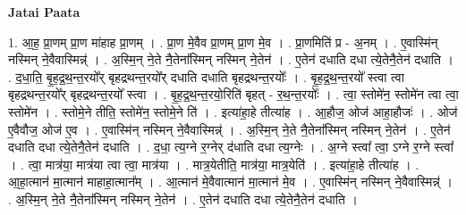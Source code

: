 \documentclass[17pt]{extarticle}
\begin{document}
\textbf{Jatai Paata} \newline

1. आ॒ह॒ प्रा॒णम् प्रा॒ण मा॑हाह प्रा॒णम् । . प्रा॒ण मे॒वैव प्रा॒णम् प्रा॒ण मे॒व । . प्रा॒णमिति॑ प्र - अ॒नम् । . ए॒वास्मि॑न् नस्मिन् ने॒वैवास्मिन्न्॑ । . अ॒स्मि॒न् ने॒ते नै॒तेना᳚स्मिन् नस्मिन् ने॒तेन॑ । . ए॒तेन॑ दधाति दधा त्ये॒तेनै॒तेन॑ दधाति । . द॒धा॒ति॒ बृ॒ह॒द्र॒थ॒न्त॒रयो᳚र् बृहद्रथन्त॒रयो᳚र् दधाति दधाति बृहद्रथन्त॒रयोः᳚ । . बृ॒ह॒द्र॒थ॒न्त॒रयो᳚ स्त्वा त्वा बृहद्रथन्त॒रयो᳚र् बृहद्रथन्त॒रयो᳚ स्त्वा । . बृ॒ह॒द्र॒थ॒न्त॒रयो॒रिति॑ बृहत् - र॒थ॒न्त॒रयोः᳚ । . त्वा॒ स्तोमे॑न॒ स्तोमे॑न त्वा त्वा॒ स्तोमे॑न । . स्तोमे॒ने तीति॒ स्तोमे॑न॒ स्तोमे॒ने ति॑ । . इत्या॑हा॒हे तीत्या॑ह । . आ॒हौज॒ ओज॑ आहा॒हौजः॑ । . ओज॑ ए॒वैवौज॒ ओज॑ ए॒व । . ए॒वास्मि॑न् नस्मिन् ने॒वैवास्मिन्न्॑ । . अ॒स्मि॒न् ने॒ते नै॒तेना᳚स्मिन् नस्मिन् ने॒तेन॑ । . ए॒तेन॑ दधाति दधा त्ये॒तेनै॒तेन॑ दधाति । . द॒धा॒ त्य॒ग्ने र॒ग्नेर् द॑धाति दधा त्य॒ग्नेः । . अ॒ग्ने स्त्वा᳚ त्वा॒ ऽग्ने र॒ग्ने स्त्वा᳚ । . त्वा॒ मात्र॑या॒ मात्र॑या त्वा त्वा॒ मात्र॑या । . मात्र॒येतीति॒ मात्र॑या॒ मात्र॒येति॑ । . इत्या॑हा॒हे तीत्या॑ह । . आ॒हा॒त्मान॑ मा॒त्मान॑ माहाहा॒त्मान᳚म् । . आ॒त्मान॑ मे॒वैवात्मान॑ मा॒त्मान॑ मे॒व । . ए॒वास्मि॑न् नस्मिन् ने॒वैवास्मिन्न्॑ । . अ॒स्मि॒न् ने॒ते नै॒तेना᳚स्मिन् नस्मिन् ने॒तेन॑ । . ए॒तेन॑ दधाति दधा त्ये॒तेनै॒तेन॑ दधाति । \newline
\end{document}
